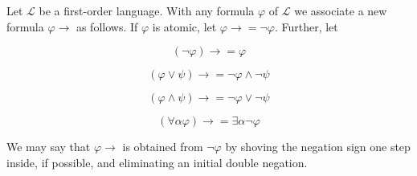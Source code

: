 Let $\mathcal{L}$ be a first-order language. With any formula $\varphi$ of $\mathcal{L}$ we associate a new formula $\varphi \rightarrow$ as follows. If $\varphi$ is atomic, let $\varphi \rightarrow = \neg \varphi$. Further, let

$$
(\neg \varphi) \rightarrow = \varphi
$$

$$
(\varphi \lor \psi) \rightarrow = \neg \varphi \land \neg \psi
$$

$$
(\varphi \land \psi) \rightarrow = \neg \varphi \lor \neg \psi
$$

$$
(\forall \alpha \varphi) \rightarrow = \exists \alpha \neg \varphi
$$

We may say that $\varphi \rightarrow$ is obtained from $\neg \varphi$ by shoving the negation sign one step inside, if possible, and eliminating an initial double negation.
